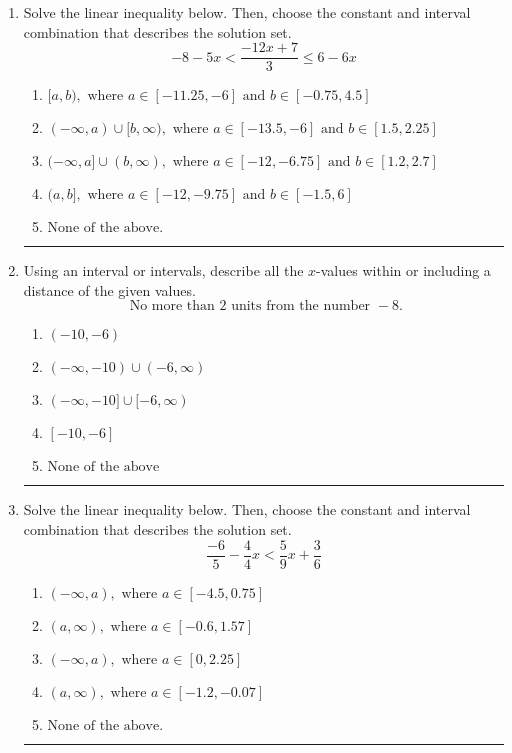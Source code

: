 \documentclass[14pt]{extbook}
\newcommand{\litem}[1]{\item#1\hspace*{-1cm}\rule{\textwidth}{0.4pt}}
\begin{document}
\begin{enumerate}
{\begin{enumerate}[label=\Alph*.]
\end{enumerate} }
\litem{
Solve the linear inequality below. Then, choose the constant and interval combination that describes the solution set.\[ -8 - 5 x < \frac{-12 x + 7}{3} \leq 6 - 6 x \]\begin{enumerate}[label=\Alph*.]
\item \( [a, b), \text{ where } a \in [-11.25, -6] \text{ and } b \in [-0.75, 4.5] \)
\item \( (-\infty, a) \cup [b, \infty), \text{ where } a \in [-13.5, -6] \text{ and } b \in [1.5, 2.25] \)
\item \( (-\infty, a] \cup (b, \infty), \text{ where } a \in [-12, -6.75] \text{ and } b \in [1.2, 2.7] \)
\item \( (a, b], \text{ where } a \in [-12, -9.75] \text{ and } b \in [-1.5, 6] \)
\item \( \text{None of the above.} \)

\end{enumerate} }
\litem{
Using an interval or intervals, describe all the $x$-values within or including a distance of the given values.\[ \text{ No more than } 2 \text{ units from the number } -8. \]\begin{enumerate}[label=\Alph*.]
\item \( (-10, -6) \)
\item \( (-\infty, -10) \cup (-6, \infty) \)
\item \( (-\infty, -10] \cup [-6, \infty) \)
\item \( [-10, -6] \)
\item \( \text{None of the above} \)

\end{enumerate} }
\litem{
Solve the linear inequality below. Then, choose the constant and interval combination that describes the solution set.\[ \frac{-6}{5} - \frac{4}{4} x < \frac{5}{9} x + \frac{3}{6} \]\begin{enumerate}[label=\Alph*.]
\item \( (-\infty, a), \text{ where } a \in [-4.5, 0.75] \)
\item \( (a, \infty), \text{ where } a \in [-0.6, 1.57] \)
\item \( (-\infty, a), \text{ where } a \in [0, 2.25] \)
\item \( (a, \infty), \text{ where } a \in [-1.2, -0.07] \)
\item \( \text{None of the above}. \)


\end{enumerate}}
\end{enumerate}
\end{document}

